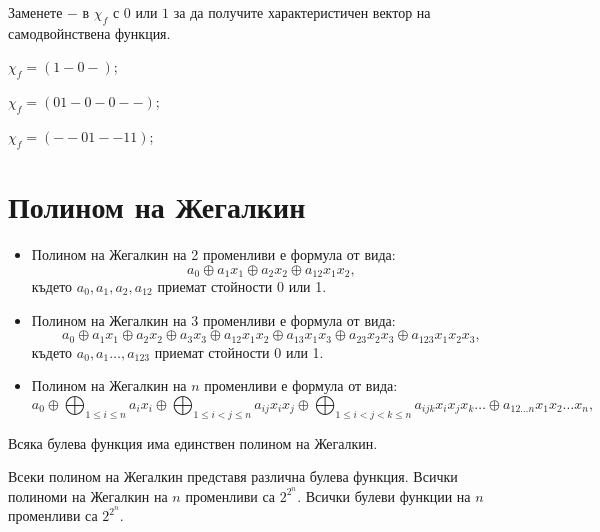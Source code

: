 \begin{problem}
  Заменете $-$ в $\chi_f$ с $0$ или $1$ за да получите характеристичен вектор на самодвойнствена функция.\\
  \begin{inparaenum}[a)]
  \item
    $\chi_f = (1-0-)$;
  \item
    $\chi_f = (01-0-0--)$;
  \item
    $\chi_f = (--01--11)$;
  \end{inparaenum}
\end{problem}

\section{Полином на Жегалкин}
\begin{itemize}
\item 
  Полином на Жегалкин на 2 променливи е формула от вида:
  \[a_0\oplus a_1x_1\oplus a_2x_2  \oplus a_{12}x_1x_2  ,\]
  където $a_0,a_1,a_2,a_{12}$ приемат стойности 0 или 1.
\item
  Полином на Жегалкин на 3 променливи е формула от вида:
  \[a_0\oplus a_1x_1\oplus a_2x_2 \oplus a_3x_3 \oplus a_{12}x_1x_2 \oplus a_{13}x_1x_3 \oplus a_{23} x_2x_3 \oplus a_{123}x_1x_2x_3,\]  
  където $a_0,a_1\dots,a_{123}$ приемат стойности 0 или 1.
\item
  Полином на Жегалкин на $n$ променливи е формула от вида:
  \[a_0 \oplus \bigoplus_{1\leq i\leq n}a_i x_i\oplus \bigoplus_{1\leq i<j \leq n}a_{ij} x_ix_j\oplus \bigoplus_{1\leq i<j<k \leq n}a_{ijk} x_ix_jx_k \dots  \oplus a_{12\dots n} x_1x_2\dots x_n,\]
\end{itemize}

\begin{thm}
  Всяка булева функция има единствен полином на Жегалкин.
\end{thm}
\begin{hint}
  Всеки полином на Жегалкин представя различна булева функция.
  Всички полиноми на Жегалкин на $n$ променливи са $2^{2^n}$.
  Всички булеви функции на $n$ променливи са $2^{2^n}$.
\end{hint}


